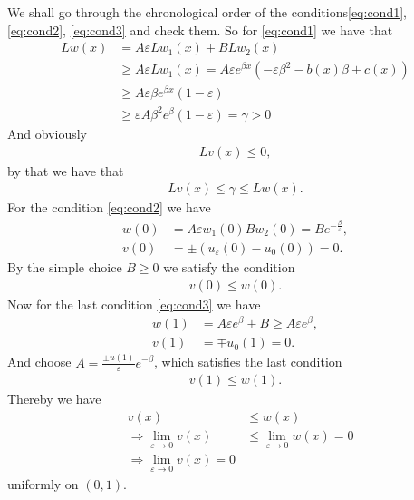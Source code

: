 \documentclass[a4paper]{article}
\newcommand{\eps}{\varepsilon}
\begin{document}
We shall go through the chronological order of the conditions\ref{eq:cond1},
\ref{eq:cond2}, \ref{eq:cond3} and check them. So for \ref{eq:cond1}
we have that
\begin{align}
    Lw(x) &= A\eps Lw_1(x) + B Lw_2(x) \\
          &\geq A\eps Lw_1(x) = A\eps e^{\beta x} \left(-\eps \beta^2 -
              b(x)\beta+c(x)\right)\\
          &\geq A\eps \beta e^{\beta x} \left(1-\eps\right)\\
          &\geq \eps A\beta^2 e^{\beta}(1-\eps) = \gamma > 0
\end{align}
And obviously
\begin{align}
    Lv(x) \leq 0 ,
\end{align}
by that we have that
\begin{align}
    Lv(x) \leq \gamma \leq  Lw(x).
\end{align}
For the condition \ref{eq:cond2} we have
\begin{align}
    w(0) &= A\eps w_1(0) Bw_2(0) = Be^{-\frac{\beta}{\eps}},\\
    v(0) &= \pm\left(u_\eps(0) - u_0(0)\right) = 0.
\end{align}
By the simple choice $B \geq 0$ we satisfy the condition
\begin{align}
    v(0) \leq w(0).
\end{align}
Now for the last condition \ref{eq:cond3} we have
\begin{align}
    w(1) &= A\eps e^\beta + B \geq A\eps e^\beta,\\
    v(1) &= \mp u_0(1) = 0.
\end{align}
And choose $A = \frac{\pm u(1)}{\eps} e^{-\beta}$, which satisfies the last
condition
\begin{align}
    v(1) \leq w(1).
\end{align}
Thereby we have
\begin{align}
    &v(x) &\leq w(x)\\
    &\Rightarrow \lim_{\eps \rightarrow 0} v(x) &\leq \lim_{\eps \rightarrow
    0} w(x) = 0\\
    &\Rightarrow \lim_{\eps \rightarrow 0} v(x) = 0
\end{align}
uniformly on $(0, 1)$.
\end{document}

